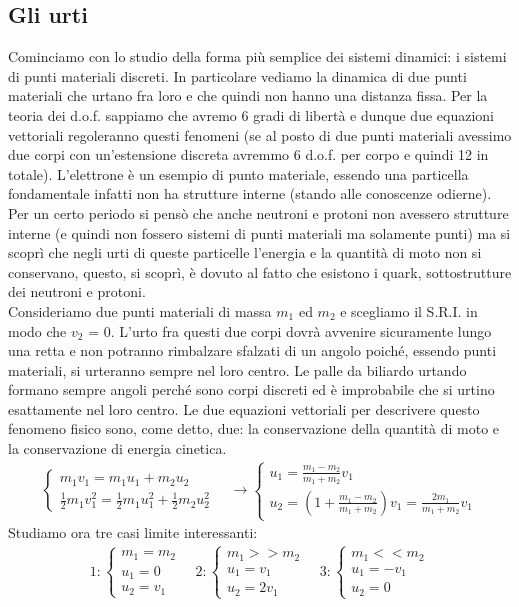 \subsection{Gli urti}
Cominciamo con lo studio della forma più semplice dei sistemi dinamici: i sistemi di punti materiali discreti. In particolare vediamo la dinamica di due punti materiali che urtano fra loro e che quindi non hanno una distanza fissa. Per la teoria dei d.o.f. sappiamo che avremo 6 gradi di libertà e dunque due equazioni vettoriali regoleranno questi fenomeni (se al posto di due punti materiali avessimo due corpi con un'estensione discreta avremmo 6 d.o.f. per corpo e quindi 12 in totale). L'elettrone è un esempio di punto materiale, essendo una particella fondamentale infatti non ha strutture interne (stando alle conoscenze odierne). Per un certo periodo si pensò che anche neutroni e protoni non avessero strutture interne (e quindi non fossero sistemi di punti materiali ma solamente punti) ma si scoprì che negli urti di queste particelle l'energia e la quantità di moto non si conservano, questo, si scoprì, è dovuto al fatto che esistono i quark, sottostrutture dei neutroni e protoni.\\
Consideriamo due punti materiali di massa $m_1$ ed $m_2$ e scegliamo il S.R.I. in modo che $v_2$ = 0. L'urto fra questi due corpi dovrà avvenire sicuramente lungo una retta e non potranno rimbalzare sfalzati di un angolo poiché, essendo punti materiali, si urteranno sempre nel loro centro. Le palle da biliardo urtando formano sempre angoli perché sono corpi discreti ed è improbabile che si urtino esattamente nel loro centro. Le due equazioni vettoriali per descrivere questo fenomeno fisico sono, come detto, due: la conservazione della quantità di moto e la conservazione di energia cinetica. 
\begin{align*}
\begin{cases}
	m_1 v_1 = m_1 u_1 + m_2 u_2\\
	\frac{1}{2}m_1 v_1^2 = \frac{1}{2} m_1 u_1^2 + \frac{1}{2} m_2 u_2^2
\end{cases} \quad
\longrightarrow
\begin{cases}
	u_1 = \frac{m_1 - m_2}{m_1 + m_2} v_1\\
	u_2 = (1 + \frac{m_1 - m_2}{m_1 + m_2})v_1 = \frac{2m_1}{m_1+m_2} v_1
\end{cases}
\end{align*}
Studiamo ora tre casi limite interessanti:
\begin{align*}
	1:
	\begin{cases}
		m_1 = m_2\\
		u_1 = 0\\
		u_2 = v_1
	\end{cases}\quad
2:
	\begin{cases}
		m_1 >> m_2\\
		u_1 = v_1\\
		u_2 = 2v_1
	\end{cases}\quad
3:
	\begin{cases}
		m_1 << m_2\\
		u_1 = -v_1\\
		u_2 = 0
	\end{cases}
\end{align*}
